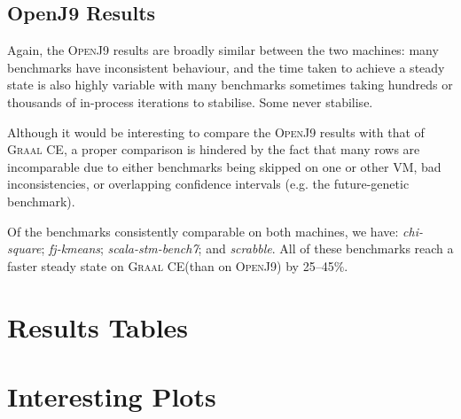 \documentclass[a4paper]{article}
\newcommand{\graalce}{\textsc{Graal CE}\xspace}
\newcommand{\graalcehs}{\textsc{Graal CE Hotspot}\xspace}
\newcommand{\jnine}{\textsc{OpenJ9}\xspace}
\newcommand{\bencherseven}{Linux$_\mathrm{1240v5}$\xspace}
\newcommand{\bencherten}{Linux$_\mathrm{1240v6}$\xspace}
\begin{document}
\subsection{OpenJ9 Results}

Again, the \jnine results are broadly similar between the two machines: many
benchmarks have inconsistent behaviour, and the time taken to achieve a steady
state is also highly variable with many benchmarks sometimes taking hundreds or
thousands of in-process iterations to stabilise. Some never stabilise.

Although it would be interesting to compare the \jnine results with that of \graalce,
a proper comparison is hindered by the fact that many rows are incomparable due
to either benchmarks being skipped on one or other VM, bad inconsistencies, or
overlapping confidence intervals (e.g. the future-genetic benchmark).

Of the benchmarks consistently comparable on both machines, we have:
\emph{chi-square}; \emph{fj-kmeans}; \emph{scala-stm-bench7}; and
\emph{scrabble}. All of these benchmarks reach a faster steady state on
\graalce (than on \jnine) by 25--45$\%$.





\appendix

\newpage
\section{Results Tables}

\newcommand{\captionbsevengraalce}{Results for \graalce on \bencherseven.}


\newpage
\newcommand{\captionbsevengraalcehs}{Results for \graalcehs on \bencherseven.}


\newpage
\newcommand{\captionbsevenjnine}{Results for \jnine on \bencherseven.}


\newpage
\newcommand{\captionbtengraalce}{Results for \graalce on \bencherten.}


\newpage
\newcommand{\captionbtengraalcehs}{Results for \graalcehs on \bencherten.}


\newpage
\newcommand{\captionbtenjnine}{Results for \jnine on \bencherten.}


\section{Interesting Plots}
\end{document}
